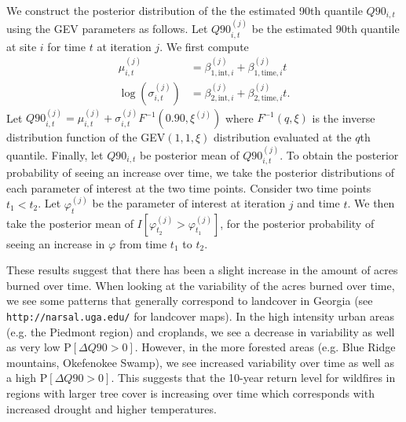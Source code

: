 \documentclass[11pt]{article}
\begin{document}
We construct the posterior distribution of the the estimated 90th quantile $Q90_{i, t}$ using the GEV parameters as follows.
Let $Q90_{i, t}^{(j)}$ be the estimated 90th quantile at site $i$ for time $t$ at iteration $j$.
We first compute
\begin{align}
  \mu_{i, t}^{(j)} &= \beta_{1, \text{int}, i}^{(j)} + \beta_{1, \text{time}, i}^{(j)} t \\
  \log\left(\sigma_{i, t}^{(j)}\right) &= \beta_{2, \text{int}, i}^{(j)} + \beta_{2, \text{time}, i}^{(j)} t. \nonumber
\end{align}
Let $Q90_{i, t}^{(j)} = \mu_{i, t}^{(j)} + \sigma_{i, t}^{(j)} F^{-1}\left(0.90, \xi^{(j)}\right)$ where $F^{-1}(q, \xi)$ is the inverse distribution function of the GEV$(1, 1, \xi)$ distribution evaluated at the $q$th quantile.
Finally, let $Q90_{i, t}$ be posterior mean of $Q90_{i, t}^{(j)}$.
To obtain the posterior probability of seeing an increase over time, we take the posterior distributions of each parameter of interest at the two time points.
Consider two time points $t_1 < t_2$.
Let $\varphi_t^{(j)}$ be the parameter of interest at iteration $j$ and time $t$.
We then take the posterior mean of $I\left[\varphi_{t_2}^{(j)} > \varphi_{t_1}^{(j)}\right]$, for the posterior probability of seeing an increase in $\varphi$ from time $t_1$ to $t_2$.

These results suggest that there has been a slight increase in the amount of acres burned over time.
When looking at the variability of the acres burned over time, we see some patterns that generally correspond to landcover in Georgia (see \texttt{http://narsal.uga.edu/} for landcover maps).
In the high intensity urban areas (e.g. the Piedmont region) and croplands, we see a decrease in variability as well as very low P$[\Delta Q90 > 0]$.
However, in the more forested areas (e.g. Blue Ridge mountains, Okefenokee Swamp), we see increased variability over time as well as a high P$[\Delta Q90 > 0]$.
This suggests that the 10-year return level for wildfires in regions with larger tree cover is increasing over time which corresponds with increased drought and higher temperatures.
\end{document}

